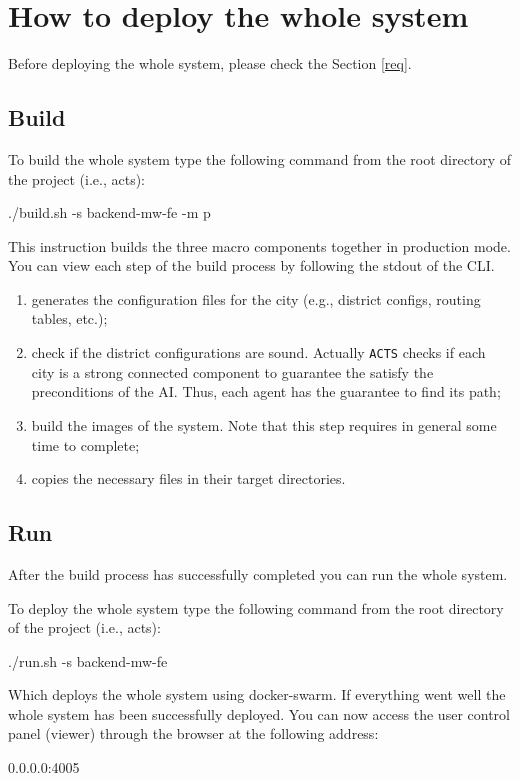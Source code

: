 \section{How to deploy the whole system}
Before deploying the whole system, please check the Section \ref{req}.

\subsection{Build}

To build the whole system type the following command from the root directory of the project (i.e., acts):

./build.sh -s backend-mw-fe -m p

This instruction builds the three macro components together in production mode.
You can view each step of the build process by following the stdout of the CLI.
\begin{enumerate}
\item generates the configuration files for the city (e.g., district configs, routing tables, etc.);
\item check if the district configurations are sound. Actually \texttt{ACTS} checks if each city
is a strong connected component to guarantee the satisfy the preconditions of the AI. Thus, each agent
has the guarantee to find its path;
\item build the images of the system. Note that this step requires in general some time to complete;
\item copies the necessary files in their target directories.
\end{enumerate}

\subsection{Run}

After the build process has successfully completed you can run the whole system.

To deploy the whole system type the following command from the root directory of the project (i.e., acts):

./run.sh -s backend-mw-fe

Which deploys the whole system using docker-swarm.
If everything went well the whole system has been successfully deployed.
You can now access the user control panel (viewer) through the browser at the following address:

0.0.0.0:4005
